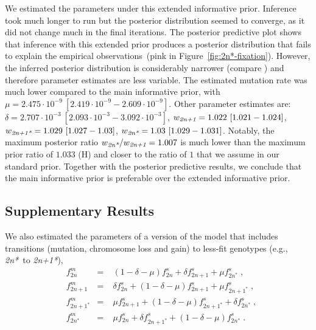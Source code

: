 \documentclass[12pt]{extarticle}
\newcommand{\anwt}{\emph{2n+1}}
\newcommand{\eumt}{\emph{2n*}}
\newcommand{\anmt}{\emph{2n+1*}}
\begin{document}
We estimated the parameters under this extended informative prior.
Inference took much longer to run but the posterior distribution seemed to converge, as it did not change much in the final iterations. 
The posterior predictive plot shows that inference with this extended prior produces a posterior distribution that fails to explain the empirical observations~(pink in Figure~\ref{fig:2n*-fixation}).
However, the inferred posterior distribution is considerably narrower (compare ) and therefore parameter estimates are less variable.
The estimated mutation rate was much lower compared to the main informative prior, 
with $\mu=2.475\cdot10^{-9}\ [2.419\cdot10^{-9}-2.609\cdot10^{-9}]$. Other parameter estimates are: $\delta=2.707\cdot10^{-3}\ [2.093\cdot10^{-3}-3.092\cdot10^{-3}]$,
$w_{\anwt}=1.022\ [1.021-1.024]$,
$w_{\anmt}=1.029\ [1.027-1.03]$,
$w_{\eumt}=1.03\ [1.029-1.031]$. 
Notably, the maximum posterior ratio $w_{\eumt}/w_{\anwt}=1.007$ is much lower than the maximum prior ratio of $1.033$ (H) and closer to the ratio of $1$ that we assume in our standard prior.
Together with the posterior predictive results, we conclude that the main informative prior is preferable over the extended informative prior.


\subsection*{Supplementary Results}

We also estimated the parameters of a version of the model that includes transitions (mutation, chromosome loss and gain) to less-fit genotypes (e.g., \eumt\ to \anmt),
\begin{equation} \label{eq:mutation-aneuploidy-single}
    \begin{aligned}
      &f^m_{2n} &=&\; (1 - \delta - \mu) f^s_{2n} + \delta f^s_{2n+1} + \mu f^s_{2n^*} \;,\\
      &f^m_{2n+1} &=&\; \delta f^s_{2n} + (1 - \delta - \mu) f^s_{2n+1} + \mu f^s_{2n+1^*}  \;,\\
      &f^m_{2n+1^*} &=&\; \mu f^s_{2n+1} + (1 - \delta - \mu) f^s_{2n+1^*} + \delta f^s_{2n^*}  \;,\\
      &f^m_{2n^*} &=&\; \mu f^s_{2n} + \delta f^s_{2n+1^*} + (1 - \delta - \mu) f^s_{2n^*}  \;.
    \end{aligned}
    \end{equation}
\end{document}
